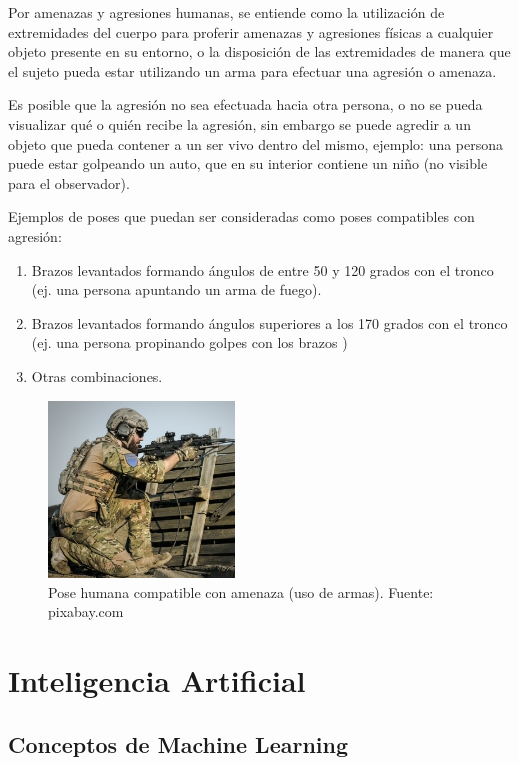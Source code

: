 \documentclass[a4paper,12pt,oneside,spanish]{book}
\begin{document}
Por amenazas y agresiones humanas, se entiende como la utilización de extremidades del cuerpo para proferir amenazas y agresiones físicas a cualquier objeto presente en su entorno, o la disposición de las extremidades de manera que el sujeto pueda estar utilizando un arma para efectuar una agresión o amenaza. \par 

Es posible que la agresión no sea efectuada hacia otra persona, o no se pueda visualizar qué o quién recibe la agresión, sin embargo se puede agredir a un objeto que pueda contener a un ser vivo dentro del mismo, ejemplo: una persona puede estar golpeando un auto, que en su interior contiene un niño (no visible para el observador).\par

Ejemplos de poses que puedan ser consideradas como poses compatibles con agresión:

\begin{enumerate}[noitemsep]
	\baselineskip 14pt
	\item Brazos levantados formando ángulos de entre 50 y 120 grados con el tronco (ej. una persona apuntando un arma de fuego). 
	\item Brazos levantados formando ángulos superiores a los 170 grados con el tronco (ej. una persona propinando golpes con los brazos ) 
	\item Otras combinaciones.
\end{enumerate}	\baselineskip 14pt

\begin{figure}[h!]
	\includegraphics[width=140pt]{Imagenes/pose2.jpg}
	\centering
	\caption{Pose humana compatible con amenaza (uso de armas). Fuente: pixabay.com}
	\label{fig:pose3}
\end{figure}

\newpage	
\chapter{Inteligencia Artificial}
\section{Conceptos de Machine Learning}
\end{document}
